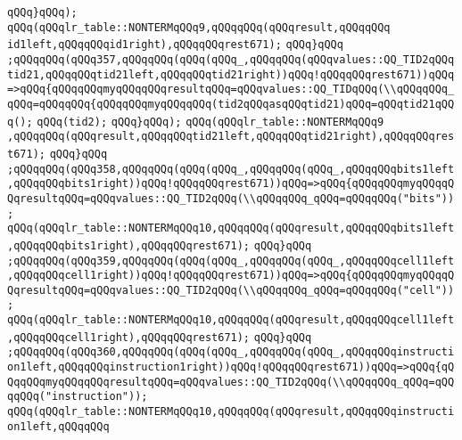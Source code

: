 \verb|qQQq}qQQq);|\newline
\verb|qQQq(qQQqlr_table::NONTERMqQQq9,qQQqqQQq(qQQqresult,qQQqqQQq|\newline
\verb|id1left,qQQqqQQqid1right),qQQqqQQqrest671);|\newline
\verb|qQQq}qQQq|\newline
\verb|;qQQqqQQq(qQQq357,qQQqqQQq(qQQq(qQQq_,qQQqqQQq(qQQqvalues::QQ_TID2qQQqtid21,qQQqqQQqtid21left,qQQqqQQqtid21right))qQQq!qQQqqQQqrest671))qQQq=>qQQq{qQQqqQQqmyqQQqqQQqresultqQQq=qQQqvalues::QQ_TIDqQQq(\\qQQqqQQq_qQQq=qQQqqQQq{qQQqqQQqmyqQQqqQQq(tid2qQQqasqQQqtid21)qQQq=qQQqtid21qQQq();|\newline
\verb|qQQq(tid2);|\newline
\verb|qQQq}qQQq);|\newline
\verb|qQQq(qQQqlr_table::NONTERMqQQq9|\newline
\verb|,qQQqqQQq(qQQqresult,qQQqqQQqtid21left,qQQqqQQqtid21right),qQQqqQQqrest671);|\newline
\verb|qQQq}qQQq|\newline
\verb|;qQQqqQQq(qQQq358,qQQqqQQq(qQQq(qQQq_,qQQqqQQq(qQQq_,qQQqqQQqbits1left,qQQqqQQqbits1right))qQQq!qQQqqQQqrest671))qQQq=>qQQq{qQQqqQQqmyqQQqqQQqresultqQQq=qQQqvalues::QQ_TID2qQQq(\\qQQqqQQq_qQQq=qQQqqQQq("bits"));|\newline
\verb|qQQq(qQQqlr_table::NONTERMqQQq10,qQQqqQQq(qQQqresult,qQQqqQQqbits1left,qQQqqQQqbits1right),qQQqqQQqrest671);|\newline
\verb|qQQq}qQQq|\newline
\verb|;qQQqqQQq(qQQq359,qQQqqQQq(qQQq(qQQq_,qQQqqQQq(qQQq_,qQQqqQQqcell1left,qQQqqQQqcell1right))qQQq!qQQqqQQqrest671))qQQq=>qQQq{qQQqqQQqmyqQQqqQQqresultqQQq=qQQqvalues::QQ_TID2qQQq(\\qQQqqQQq_qQQq=qQQqqQQq("cell"));|\newline
\verb|qQQq(qQQqlr_table::NONTERMqQQq10,qQQqqQQq(qQQqresult,qQQqqQQqcell1left,qQQqqQQqcell1right),qQQqqQQqrest671);|\newline
\verb|qQQq}qQQq|\newline
\verb|;qQQqqQQq(qQQq360,qQQqqQQq(qQQq(qQQq_,qQQqqQQq(qQQq_,qQQqqQQqinstruction1left,qQQqqQQqinstruction1right))qQQq!qQQqqQQqrest671))qQQq=>qQQq{qQQqqQQqmyqQQqqQQqresultqQQq=qQQqvalues::QQ_TID2qQQq(\\qQQqqQQq_qQQq=qQQqqQQq("instruction"));|\newline
\verb|qQQq(qQQqlr_table::NONTERMqQQq10,qQQqqQQq(qQQqresult,qQQqqQQqinstruction1left,qQQqqQQq|\newline
